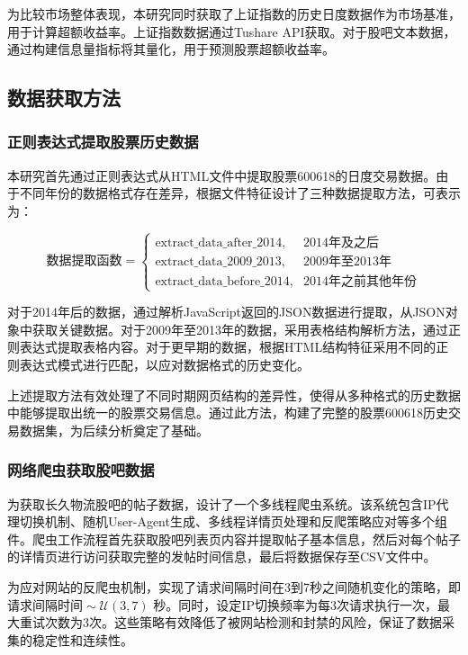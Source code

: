 \documentclass[12pt, a4paper]{article}
\begin{document}
为比较市场整体表现，本研究同时获取了上证指数的历史日度数据作为市场基准，用于计算超额收益率。上证指数数据通过Tushare API获取。对于股吧文本数据，通过构建信息量指标将其量化，用于预测股票超额收益率。

\subsection{数据获取方法}

\subsubsection{正则表达式提取股票历史数据}
本研究首先通过正则表达式从HTML文件中提取股票600618的日度交易数据。由于不同年份的数据格式存在差异，根据文件特征设计了三种数据提取方法，可表示为：

\begin{equation}
\text{数据提取函数} = 
\begin{cases}
\text{extract\_data\_after\_2014}, & \text{2014年及之后} \\
\text{extract\_data\_2009\_2013}, & \text{2009年至2013年} \\
\text{extract\_data\_before\_2014}, & \text{2014年之前其他年份}
\end{cases}
\end{equation}

对于2014年后的数据，通过解析JavaScript返回的JSON数据进行提取，从JSON对象中获取关键数据。对于2009年至2013年的数据，采用表格结构解析方法，通过正则表达式提取表格内容。对于更早期的数据，根据HTML结构特征采用不同的正则表达式模式进行匹配，以应对数据格式的历史变化。

上述提取方法有效处理了不同时期网页结构的差异性，使得从多种格式的历史数据中能够提取出统一的股票交易信息。通过此方法，构建了完整的股票600618历史交易数据集，为后续分析奠定了基础。

\subsubsection{网络爬虫获取股吧数据}
为获取长久物流股吧的帖子数据，设计了一个多线程爬虫系统。该系统包含IP代理切换机制、随机User-Agent生成、多线程详情页处理和反爬策略应对等多个组件。爬虫工作流程首先获取股吧列表页内容并提取帖子基本信息，然后对每个帖子的详情页进行访问获取完整的发帖时间信息，最后将数据保存至CSV文件中。

为应对网站的反爬虫机制，实现了请求间隔时间在3到7秒之间随机变化的策略，即$\text{请求间隔时间} \sim \mathcal{U}(3, 7) \text{ 秒}$。同时，设定IP切换频率为每3次请求执行一次，最大重试次数为3次。这些策略有效降低了被网站检测和封禁的风险，保证了数据采集的稳定性和连续性。
\end{document}
